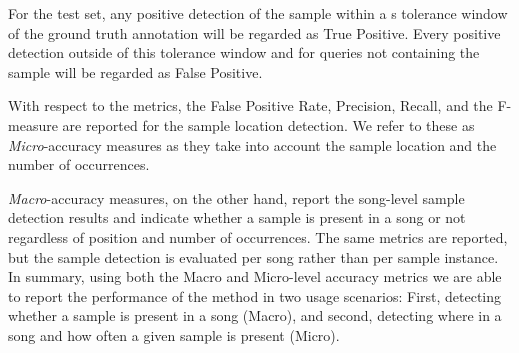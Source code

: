 \documentclass{article}
\begin{document}
For the test set, any positive detection of the sample within a \unit[1]{s} tolerance window of the ground truth annotation will be regarded as True Positive. Every positive detection outside of this tolerance window and for queries not containing the sample will be regarded as False Positive.

With respect to the metrics, the False Positive Rate, Precision, Recall, and the  F-measure are reported for the sample location detection. We refer to these as \textit{Micro}-accuracy measures as they take into account the sample location and the number of occurrences.

\textit{Macro}-accuracy measures, on the other hand, report the song-level sample detection results and indicate whether a sample is present in a song or not regardless of position and number of occurrences. The same metrics are reported, but the sample detection is evaluated per song rather than per sample instance.
In summary, using both the Macro and Micro-level accuracy metrics we are able to report the performance of the method in two usage scenarios: First, detecting whether a sample is present in a song (Macro), and second, detecting where in a song and how often a given sample is present (Micro).
\end{document}
